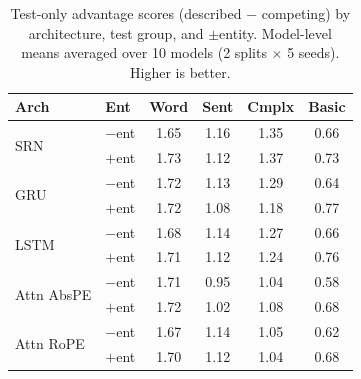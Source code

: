 \begin{table}[t]
\centering
\small
\begin{tabular}{@{}llcccc@{}}
\toprule
\textbf{Arch} & \textbf{Ent} & \textbf{Word} & \textbf{Sent} & \textbf{Cmplx} & \textbf{Basic} \\
\midrule
\multirow{2}{*}{SRN} & $-$ent & 1.65 & 1.16 & 1.35 & 0.66 \\
 & $+$ent & 1.73 & 1.12 & 1.37 & 0.73 \\
\midrule
\multirow{2}{*}{GRU} & $-$ent & 1.72 & 1.13 & 1.29 & 0.64 \\
 & $+$ent & 1.72 & 1.08 & 1.18 & 0.77 \\
\midrule
\multirow{2}{*}{LSTM} & $-$ent & 1.68 & 1.14 & 1.27 & 0.66 \\
 & $+$ent & 1.71 & 1.12 & 1.24 & 0.76 \\
\midrule
\multirow{2}{*}{Attn AbsPE} & $-$ent & 1.71 & 0.95 & 1.04 & 0.58 \\
 & $+$ent & 1.72 & 1.02 & 1.08 & 0.68 \\
\midrule
\multirow{2}{*}{Attn RoPE} & $-$ent & 1.67 & 1.14 & 1.05 & 0.62 \\
 & $+$ent & 1.70 & 1.12 & 1.04 & 0.68 \\
\bottomrule
\end{tabular}
\caption{Test-only advantage scores (described $-$ competing) by architecture, test group, and $\pm$entity. Model-level means averaged over 10 models (2 splits $\times$ 5 seeds). Higher is better.}
\label{tab:main_results_model}
\end{table}
